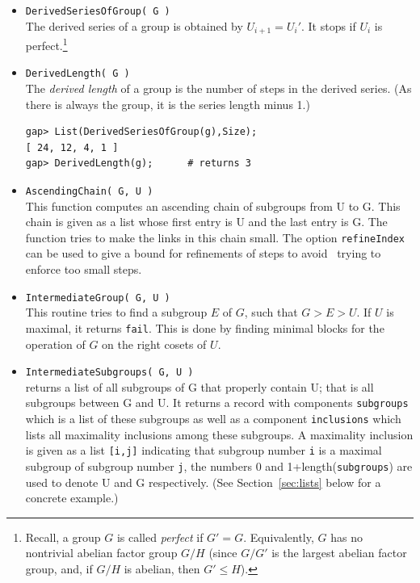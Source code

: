 \begin{itemize}
{\begin{verbatim}
[ Group([ (3,4), (2,4,3), (1,4)(2,3), (1,3)(2,4) ]),
Group([ (2,4,3), (1,4)(2,3), (1,3)(2,4) ]),
Group([ (1,4)(2,3), (1,3)(2,4) ]), Group([ (1,3)(2,4) ]), Group(()) ]
gap> DisplayCompositionSeries(Group((1,2,3,4,5,6,7),(1,2)));
G (2 gens, size 5040)
| Z(2)
S (5 gens, size 2520)
| A(7)
1 (0 gens, size 1)
\end{verbatim}}
\item {\tt DerivedSeriesOfGroup( G )}\\[2pt] 
The derived series of a group is obtained by $U_{i+1} = U_i'$. It stops if $U_i$ is
perfect.\footnote{Recall, a group $G$ is called \emph{perfect} if $G' = G$.
  Equivalently, $G$ has no nontrivial abelian factor group $G/H$ (since $G/G'$ is the
  largest abelian factor group, and, if $G/H$ is abelian, then $G'\leq H$).}
\item {\tt DerivedLength( G )}\\[2pt] 
The \emph{derived length} of a group is the number of steps in the derived series. (As there is always the group, it
is the series length minus 1.)
{\codesize
\begin{verbatim}
gap> List(DerivedSeriesOfGroup(g),Size);
[ 24, 12, 4, 1 ]
gap> DerivedLength(g);      # returns 3
\end{verbatim}}
\item {\tt AscendingChain( G, U )}\\[2pt] 
This function computes an ascending chain of subgroups from U to G. This chain is given as a list whose
first entry is U and the last entry is G. The function tries to make the links in this chain small.
The option {\tt refineIndex} can be used to give a bound for refinements of steps to avoid \gap\ trying to enforce
too small steps.
\item {\tt IntermediateGroup( G, U )}\\[2pt] 
This routine tries to find a subgroup $E$ of $G$, such that $G > E > U$. If $U$ is maximal,
it returns {\tt fail}. This is done by finding minimal blocks for the operation of $G$ on the right cosets of $U$.
\item {\tt IntermediateSubgroups( G, U )}\\[2pt] 
returns a list of all subgroups of G that properly contain U; that is all subgroups between G and U. It
returns a record with components {\tt subgroups} which is a list of these subgroups as well as a component
{\tt inclusions} which lists all maximality inclusions among these subgroups. A maximality inclusion is given as
a list {\tt [i,j]} indicating that subgroup number {\tt i} is a maximal subgroup
of subgroup number {\tt j}, the numbers 0 and 1+length({\tt subgroups}) are used
to denote U and G respectively.
(See Section~\ref{sec:lists} below for a concrete example.)
\end{itemize}

